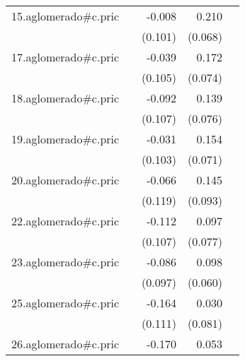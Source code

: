 {\begin{longtable}{l*{4}{D{.}{.}{-1}}}
\addlinespace
15.aglomerado#c.pric&                     &      -0.008         &       0.210\sym{**} &                     \\
            &                     &     (0.101)         &     (0.068)         &                     \\
\addlinespace
17.aglomerado#c.pric&                     &      -0.039         &       0.172\sym{*}  &                     \\
            &                     &     (0.105)         &     (0.074)         &                     \\
\addlinespace
18.aglomerado#c.pric&                     &      -0.092         &       0.139         &                     \\
            &                     &     (0.107)         &     (0.076)         &                     \\
\addlinespace
19.aglomerado#c.pric&                     &      -0.031         &       0.154\sym{*}  &                     \\
            &                     &     (0.103)         &     (0.071)         &                     \\
\addlinespace
20.aglomerado#c.pric&                     &      -0.066         &       0.145         &                     \\
            &                     &     (0.119)         &     (0.093)         &                     \\
\addlinespace
22.aglomerado#c.pric&                     &      -0.112         &       0.097         &                     \\
            &                     &     (0.107)         &     (0.077)         &                     \\
\addlinespace
23.aglomerado#c.pric&                     &      -0.086         &       0.098         &                     \\
            &                     &     (0.097)         &     (0.060)         &                     \\
\addlinespace
25.aglomerado#c.pric&                     &      -0.164         &       0.030         &                     \\
            &                     &     (0.111)         &     (0.081)         &                     \\
\addlinespace
26.aglomerado#c.pric&                     &      -0.170         &       0.053         &                     \\

\end{longtable}}
